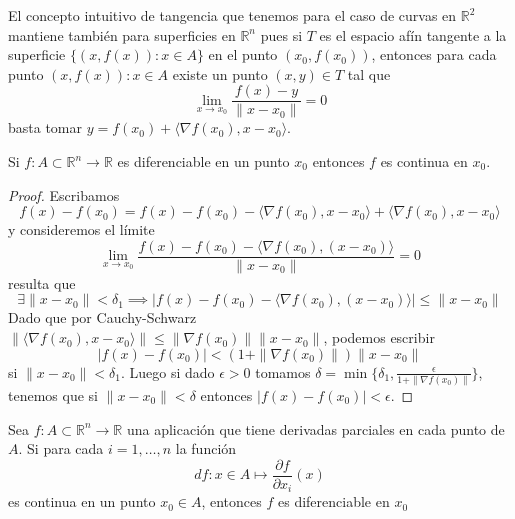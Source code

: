 \begin{observación}
    El concepto intuitivo de tangencia que tenemos para el caso de curvas en $\mathbb{R}^2$ mantiene también para superficies en $\mathbb{R}^n$ pues si $T$ es el espacio afín tangente a la superficie $\{(x,f(x)) : x \in A\}$ en el punto $(x_0,f(x_0))$, entonces para cada punto $(x, f(x)) : x \in A$ existe un punto $(x, y) \in T$ tal que
    $$ \lim_{x \to x_0} \frac{f(x) - y}{\|x - x_0\|} = 0 $$
    basta tomar $y = f(x_0) + \langle \nabla f(x_0), x - x_0\rangle$.
\end{observación}


\begin{teorema}
    Si $f: A \subset \mathbb{R}^n \to \mathbb{R}$ es diferenciable en un punto $x_0$ entonces $f$ es continua en $x_0$.
\end{teorema}

\begin{proof}
    Escribamos 
    $$f(x) - f(x_0) = f(x) - f(x_0) - \langle \nabla f(x_0), x - x_0\rangle + \langle \nabla f(x_0), x - x_0\rangle$$
    y consideremos el límite
    $$ \lim_{x \to x_0} \frac{f(x) - f(x_0) - \langle \nabla f(x_0), (x - x_0) \rangle}{\|x - x_0\|}  = 0 $$
    resulta que 
    $$ \exists \|x - x_0\| < \delta_1 \implies \left| f(x) - f(x_0) - \langle \nabla f(x_0), (x - x_0) \rangle \right| \leq \|x - x_0\|$$
    Dado que por Cauchy-Schwarz $\|\langle \nabla f(x_0), x - x_0 \rangle \| \leq \|\nabla f(x_0)\| \|x - x_0\|$, podemos escribir
    $$ |f(x) - f(x_0)| < (1 + \|\nabla f(x_0)\|) \|x - x_0\| $$
    si $\|x - x_0\| < \delta_1$. Luego si dado $\epsilon > 0$ tomamos $\delta = \min\{\delta_1, \frac{\epsilon}{1 + \|\nabla f(x_0)\|}\}$, tenemos que si $\|x - x_0\| < \delta$ entonces $|f(x) - f(x_0)| < \epsilon$.
\end{proof}

\begin{teorema}
    Sea $f:A \subset \mathbb{R}^n \to \mathbb{R}$ una aplicación que tiene derivadas parciales en cada punto de $A$. Si para cada $i = 1, \ldots, n$ la función
    $$df: x \in A \mapsto \frac{\partial f}{\partial x_i}(x)$$
    es continua en un punto $x_0 \in A$, entonces $f$ es diferenciable en $x_0$ 
\end{teorema}

